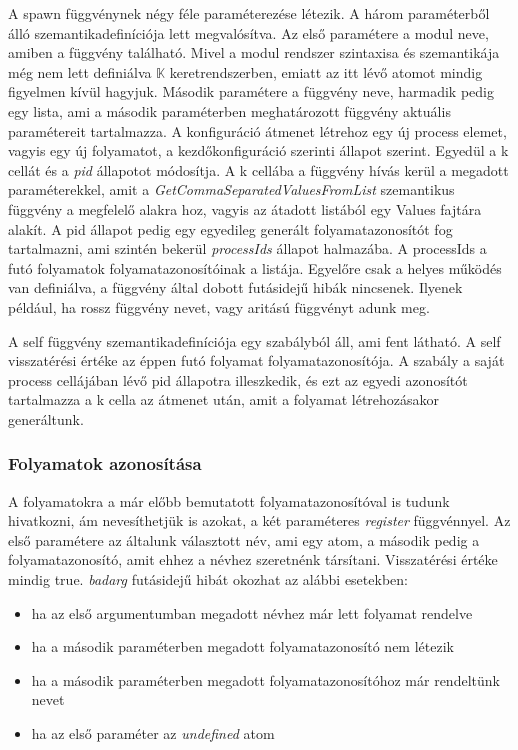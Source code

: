 A spawn függvénynek négy féle paraméterezése létezik. A három paraméterből álló szemantikadefiníciója lett megvalósítva. Az első paramétere a modul neve, amiben a függvény található. Mivel a modul rendszer szintaxisa és szemantikája még nem lett definiálva $\mathbb{K}$ keretrendszerben, emiatt az itt lévő atomot mindig figyelmen kívül hagyjuk. Második paramétere a függvény neve, harmadik pedig egy lista, ami a második paraméterben meghatározott függvény aktuális paramétereit tartalmazza. A konfiguráció átmenet létrehoz egy új process elemet, vagyis egy új folyamatot, a kezdőkonfiguráció szerinti állapot szerint. Egyedül a k cellát és a \textit{pid} állapotot módosítja. A k cellába a függvény hívás kerül a megadott paraméterekkel, amit a \textit{GetCommaSeparatedValuesFromList} szemantikus függvény a megfelelő alakra hoz, vagyis az átadott listából egy Values fajtára alakít. A pid állapot pedig egy egyedileg generált folyamatazonosítót fog tartalmazni, ami szintén bekerül \textit{processIds} állapot halmazába. A processIds a futó folyamatok folyamatazonosítóinak a listája. Egyelőre csak a helyes működés van definiálva, a függvény által dobott futásidejű hibák nincsenek. Ilyenek például, ha rossz függvény nevet, vagy aritású függvényt adunk meg.



A self függvény szemantikadefiníciója egy szabályból áll, ami fent látható. A self visszatérési értéke az éppen futó folyamat folyamatazonosítója. A szabály a saját process cellájában lévő pid állapotra illeszkedik, és ezt az egyedi azonosítót tartalmazza a k cella az átmenet után, amit a folyamat létrehozásakor generáltunk.

\subsubsection{Folyamatok azonosítása}

A folyamatokra a már előbb bemutatott folyamatazonosítóval is tudunk hivatkozni, ám nevesíthetjük is azokat, a két paraméteres \textit{register} függvénnyel. Az első paramétere az általunk választott név, ami egy atom, a második pedig a folyamatazonosító, amit ehhez a névhez szeretnénk társítani. Visszatérési értéke mindig true. \textit{badarg} futásidejű hibát okozhat az alábbi esetekben:

\begin{itemize}
\item ha az első argumentumban megadott névhez már lett folyamat rendelve
\item ha a második paraméterben megadott folyamatazonosító nem létezik
\item ha a második paraméterben megadott folyamatazonosítóhoz már rendeltünk nevet
\item ha az első paraméter az \textit{undefined} atom
\end{itemize}


